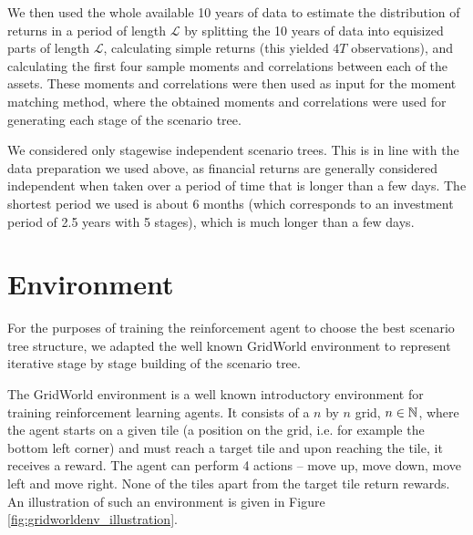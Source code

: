 We then used the whole available 10 years of data to estimate the distribution of returns in a period of length  $\mathcal{L}$ by splitting the 10 years of data into equisized parts of length $\mathcal{L}$, calculating simple returns (this yielded $4T$ observations), and calculating the first four sample moments and correlations between each of the assets. These moments and correlations were then used as input for the moment matching method, where the obtained moments and correlations were used for generating each stage of the scenario tree.

\begin{rem}
We considered only stagewise independent scenario trees. This is in line with the data preparation we used above, as financial returns are generally considered independent when taken over a period of time that is longer than a few days. The shortest period we used is about $6$ months (which corresponds to an investment period of 2.5 years with 5 stages), which is much longer than a few days.
\end{rem}

\section{Environment}
For the purposes of training the reinforcement agent to choose the best scenario tree structure, we adapted the well known GridWorld environment to represent iterative stage by stage building of the scenario tree.
\begin{rem}
The GridWorld environment is a well known introductory environment for training reinforcement learning agents. It consists of a $n$ by $n$ grid, $n \in \mathbb{N}$, where the agent starts on a given tile (a position on the grid, i.e. for example the bottom left corner) and must reach a target tile and upon reaching the tile, it receives a reward. The agent can perform 4 actions -- move up, move down, move left and move right. None of the tiles apart from the target tile return rewards. An illustration of such an environment is given in Figure \ref{fig:gridworldenv_illustration}.
\end{rem}

